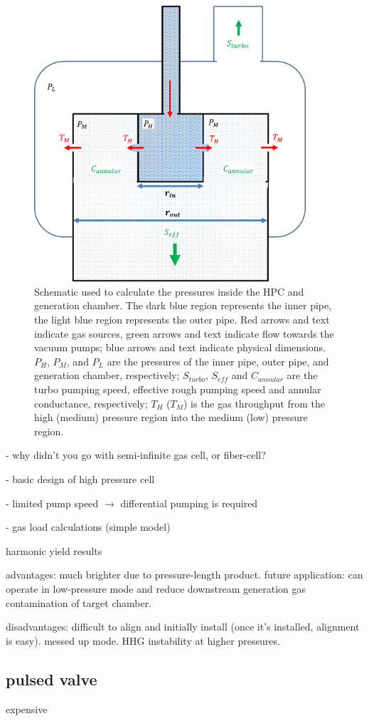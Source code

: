 \begin{figure}
	\centering
	\includegraphics[width=0.9\textwidth]{figures/chap2/HPC_pressure_schematic.png}
	\caption{Schematic used to calculate the pressures inside the HPC and generation chamber. The dark blue region represents the inner pipe, the light blue region represents the outer pipe. Red arrows and text indicate gas sources, green arrows and text indicate flow towards the vacuum pumps; blue arrows and text indicate physical dimensions. $P_H$, $P_M$, and $P_L$ are the pressures of the inner pipe, outer pipe, and generation chamber, respectively; $S_{turbo}$, $S_{eff}$ and $C_{annular}$ are the turbo pumping speed, effective rough pumping speed and annular conductance, respectively; $T_H$ ($T_M$) is the gas throughput from the high (medium) pressure region into the medium (low) pressure region.}
	\label{fig:HPC_pressure_schematic}
\end{figure}

- why didn't you go with semi-infinite gas cell, or fiber-cell?

- basic design of high pressure cell

- limited pump speed $\rightarrow$ differential pumping is required

- gas load calculations (simple model)

harmonic yield results

advantages: much brighter due to pressure-length product. future application: can operate in low-pressure mode and reduce downstream generation gas contamination of target chamber.

disadvantages: difficult to align and initially install (once it's installed, alignment is easy). messed up mode. HHG instability at higher pressures.

\subsection{pulsed valve}

expensive

